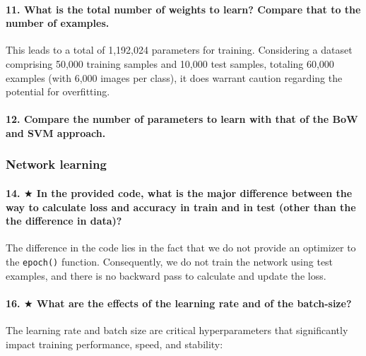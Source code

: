 \documentclass{article}
\theoremstyle{plain}%
\theoremstyle{definition}
\theoremstyle{remark}
\begin{document}
\paragraph{11. What is the total number of weights to learn? Compare that to the number of examples.}
This leads to a total of 1,192,024 parameters for training. Considering a dataset comprising 50,000 training samples and 10,000 test samples, totaling 60,000 examples (with 6,000 images per class), it does warrant caution regarding the potential for overfitting.

\paragraph{12. Compare the number of parameters to learn with that of the BoW and SVM approach.}

\subsubsection{Network learning}
\paragraph{14. $ \bigstar $ In the provided code, what is the major difference between the way to calculate loss and accuracy in train and in test (other than the the difference in data)?}
The difference in the code lies in the fact that we do not provide an optimizer to the \texttt{epoch()} function. Consequently, we do not train the network using test examples, and there is no backward pass to calculate and update the loss.

\paragraph{16. $ \bigstar $ What are the effects of the learning rate and of the batch-size?}
The learning rate and batch size are critical hyperparameters that significantly impact training performance, speed, and stability:
\end{document}

